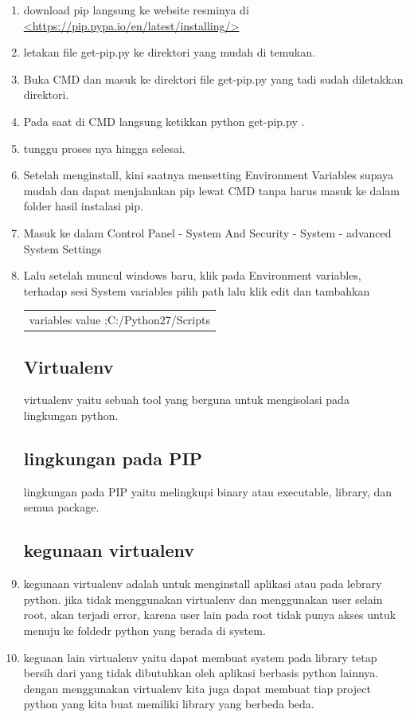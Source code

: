 		\begin{enumerate}
			\item download pip langsung ke website resminya di \url{<https://pip.pypa.io/en/latest/installing/>}
			\item letakan file get-pip.py ke direktori yang mudah di temukan.
			\item Buka CMD dan masuk ke direktori file get-pip.py yang tadi sudah diletakkan direktori.
			\item Pada saat di CMD langsung ketikkan python get-pip.py .
			\item tunggu proses nya hingga selesai.
			\item Setelah menginstall, kini saatnya mensetting Environment Variables supaya mudah dan dapat menjalankan pip lewat CMD tanpa harus masuk ke dalam folder hasil instalasi pip.
			\item Masuk ke dalam Control Panel - System And Security - System - advanced System Settings
			\item Lalu setelah muncul windows baru, klik pada Environment variables, terhadap sesi System variables pilih path lalu klik edit dan tambahkan
				\begin{table}[H]
					\begin{tabular}{|c|}
						\hline
						variables value ;C:/Python27/Scripts\\
					\end{tabular}
				\end{table}
				
	\subsection{Virtualenv}
	virtualenv yaitu sebuah tool yang berguna untuk mengisolasi pada lingkungan python.
	
	\subsection{lingkungan pada PIP}
	lingkungan pada PIP yaitu melingkupi binary atau executable, library, dan semua package.
	
	\subsection{kegunaan virtualenv}
			\item kegunaan virtualenv adalah untuk menginstall aplikasi atau pada lebrary python. jika tidak menggunakan virtualenv dan menggunakan user selain root,
				akan terjadi error, karena user lain pada root tidak punya akses untuk menuju ke foldedr python yang berada di system.
			\item keguaan lain virtualenv yaitu dapat membuat system pada library tetap bersih dari yang tidak dibutuhkan oleh aplikasi berbasis python lainnya.
				dengan menggunakan virtualenv kita juga dapat membuat tiap project python yang kita buat memiliki library yang berbeda beda. 
				

\end{enumerate}
